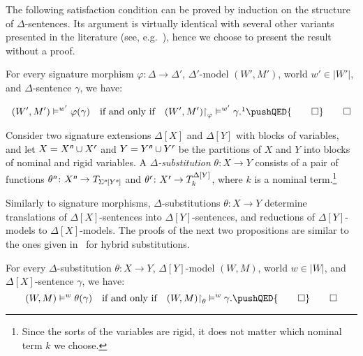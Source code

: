 \documentclass[a4paper,UKenglish,cleveref,autoref]{lipics-v2019}
\begin{document}
The following satisfaction condition can be proved by induction on the structure of \(\Delta\)-sentences.
Its argument is virtually identical with several other variants presented in the literature (see, e.g.~\cite{Diaconescu16}), hence we choose to present the result without a proof.

\begin{proposition}
  \label{proposition:morph-sat-cond}
  For every signature morphism \(\varphi \colon \Delta \to \Delta'\), \(\Delta'\)-model \((W', M')\), world \(w' \in |W'|\), and \(\Delta\)-sentence \(\gamma\), we have:
  \addtocounter{footnote}{-1}
  \[
    (W', M') \models^{w'} \varphi(\gamma)
    \quad\text{if and only if}\quad
    (W', M') \red_{\varphi} \models^{w'} \gamma.\footnotemark
    \pushQED{\qed}
    \qedhere
  \]
\end{proposition}

Consider two signature extensions \(\Delta[X]\) and \(\Delta[Y]\) with blocks of variables, and let \(X = X^{\text{\normalfont\sffamily\itshape n}} \cup X^{\text{\normalfont\sffamily\itshape r}}\) and \(Y = Y^{\text{\normalfont\sffamily\itshape n}} \cup Y^{\text{\normalfont\sffamily\itshape r}}\) be the partitions of \(X\) and \(Y\) into blocks of nominal and rigid variables.
A \emph{\(\Delta\)-substitution} \(\theta \colon X \to Y\) consists of a pair of functions
\(\theta^{\text{\normalfont\sffamily\itshape n}} \colon X^{\text{\normalfont\sffamily\itshape n}} \to T_{\Sigma^{\text{\normalfont\sffamily\itshape n}}[Y^{\text{\normalfont\sffamily\itshape n}}]}\) and
\(\theta^{\text{\normalfont\sffamily\itshape r}} \colon X^{\text{\normalfont\sffamily\itshape r}} \to T^{\Delta[Y]}_{k}\), where \(k\) is a nominal term.\footnote{Since the sorts of the variables are rigid, it does not matter which nominal term \(k\) we choose.}

Similarly to signature morphisms, \(\Delta\)-substitutions \(\theta \colon X \to Y\) determine translations of \(\Delta[X]\)-sentences into \(\Delta[Y]\)-sentences, and reductions of \(\Delta[Y]\)-models to \(\Delta[X]\)-models.
The proofs of the next two propositions are similar to the ones given in~\cite{Gaina17Her} for hybrid substitutions.

\begin{proposition}
  \label{proposition:subst-sat-cond}
  For every \(\Delta\)-substitution \(\theta \colon X \to Y\), \(\Delta[Y]\)-model \((W, M)\), world \(w \in |W|\), and \(\Delta[X]\)-sentence \(\gamma\), we have:
  \[
    (W, M) \models^{w} \theta(\gamma)
    \quad\text{if and only if}\quad
    (W, M) \red_{\theta} \models^{w} \gamma.
    \pushQED{\qed}\qedhere
  \]
\end{proposition} 
\end{document}
